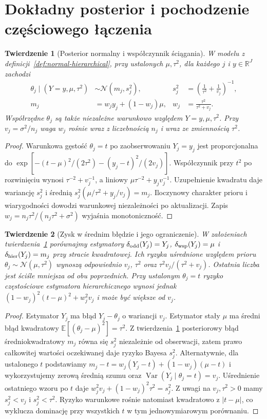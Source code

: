\documentclass[11pt,a4paper,oneside]{report}
\numberwithin{equation}{chapter}
\theoremstyle{plain}
\newtheorem{twierdzenie}{Twierdzenie}[chapter]
\theoremstyle{definition}
\theoremstyle{remark}
\newcommand{\R}{\mathbb R}
\newcommand{\E}{\mathbb E}
\newcommand{\Var}{\operatorname{Var}}
\newcommand{\Normal}{\mathcal N}
\begin{document}
\section{Dokładny posterior i pochodzenie częściowego łączenia}
\begin{twierdzenie}[Posterior normalny i współczynnik ściągania]
\label{thm:normal-partial-pooling}
W modelu z definicji~\ref{def:normal-hierarchical}, przy ustalonych
$\mu,\tau^2$, dla każdego $j$ i $y\in\R^J$ zachodzi
\[
\begin{aligned}
 \theta_j\mid (Y=y,\mu,\tau^2)&\sim\Normal(m_j,s_j^2),
 & s_j^2&=\left(\frac1{\tau^2}+\frac1{v_j}\right)^{-1},\\
 m_j&=w_jy_j+(1-w_j)\mu,
 & w_j&=\frac{\tau^2}{\tau^2+v_j}.
\end{aligned}
\]
Współrzędne $\theta_j$ są także niezależne warunkowo względem
$Y=y,\mu,\tau^2$. Przy $v_j=\sigma^2/n_j$ waga $w_j$ rośnie
wraz z liczebnością $n_j$ i wraz ze zmiennością $\tau^2$.
\end{twierdzenie}
\begin{proof}
Warunkowa gęstość $\theta_j=t$ po zaobserwowaniu $Y_j=y_j$
jest proporcjonalna do
$\exp[-(t-\mu)^2/(2\tau^2)-(y_j-t)^2/(2v_j)]$.
Współczynnik przy $t^2$ po rozwinięciu wynosi
$\tau^{-2}+v_j^{-1}$, a liniowy
$\mu\tau^{-2}+y_jv_j^{-1}$. Uzupełnienie kwadratu
daje wariancję $s_j^2$ i średnią
$s_j^2(\mu/\tau^2+y_j/v_j)=m_j$.
Iloczynowy charakter prioru i wiarygodności dowodzi
warunkowej niezależności po aktualizacji. Zapis
$w_j=n_j\tau^2/(n_j\tau^2+\sigma^2)$ wyjaśnia monotoniczność.
\end{proof}

\begin{twierdzenie}[Zysk w średnim błędzie i jego ograniczenie]
\label{thm:shrinkage-bayes-risk}
W założeniach twierdzenia~\ref{thm:normal-partial-pooling}
porównajmy estymatory $\delta_{\rm odd}(Y_j)=Y_j$,
$\delta_{\rm wsp}(Y_j)=\mu$ i
$\delta_{\rm hier}(Y_j)=m_j$ przy stracie kwadratowej.
Ich ryzyka uśrednione względem prioru $\theta_j\sim\Normal(\mu,\tau^2)$
wynoszą odpowiednio $v_j$, $\tau^2$ oraz
$\tau^2v_j/(\tau^2+v_j)$.
Ostatnia liczba jest ściśle mniejsza od obu poprzednich.
Przy \emph{ustalonym} $\theta_j=t$ ryzyko częstościowe estymatora
hierarchicznego wynosi jednak
$(1-w_j)^2(t-\mu)^2+w_j^2v_j$ i może być większe od $v_j$.
\end{twierdzenie}
\begin{proof}
Estymator $Y_j$ ma błąd $Y_j-\theta_j$ o wariancji $v_j$.
Estymator stały $\mu$ ma średni błąd kwadratowy
$\E[(\theta_j-\mu)^2]=\tau^2$.
Z twierdzenia~\ref{thm:normal-partial-pooling} posteriorowy
błąd średniokwadratowy $m_j$ równa się $s_j^2$ niezależnie od
obserwacji, zatem prawo całkowitej wartości oczekiwanej
daje ryzyko Bayesa $s_j^2$.
Alternatywnie, dla ustalonego $t$ podstawiamy
$m_j-t=w_j(Y_j-t)+(1-w_j)(\mu-t)$ i wykorzystujemy
zerową średnią szumu oraz $\Var(Y_j\mid\theta_j=t)=v_j$.
Uśrednienie ostatniego wzoru po $t$ daje
$w_j^2v_j+(1-w_j)^2\tau^2=s_j^2$.
Z uwagi na $v_j,\tau^2>0$ mamy
$s_j^2<v_j$ i $s_j^2<\tau^2$. Ryzyko warunkowe rośnie
natomiast kwadratowo z $|t-\mu|$, co wyklucza dominację
przy wszystkich $t$ w tym jednowymiarowym porównaniu.
\end{proof}
\end{document}
